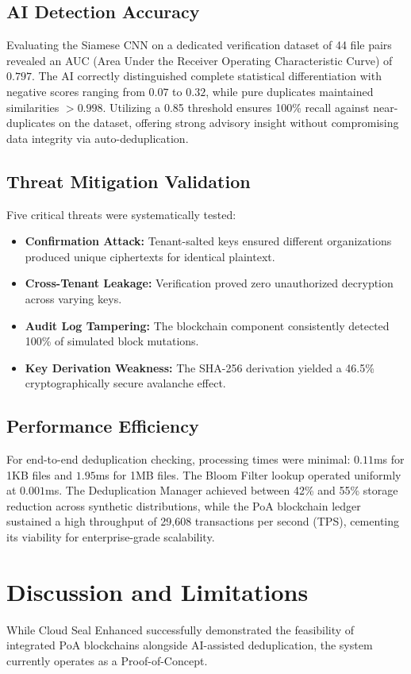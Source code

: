 \documentclass[conference]{IEEEtran}
\begin{document}
\subsection{AI Detection Accuracy}
Evaluating the Siamese CNN on a dedicated verification dataset of 44 file pairs revealed an AUC (Area Under the Receiver Operating Characteristic Curve) of $0.797$. The AI correctly distinguished complete statistical differentiation with negative scores ranging from $0.07$ to $0.32$, while pure duplicates maintained similarities $>0.998$. Utilizing a 0.85 threshold ensures 100\% recall against near-duplicates on the dataset, offering strong advisory insight without compromising data integrity via auto-deduplication. 

\subsection{Threat Mitigation Validation}
Five critical threats were systematically tested:
\begin{itemize}
    \item \textbf{Confirmation Attack:} Tenant-salted keys ensured different organizations produced unique ciphertexts for identical plaintext.
    \item \textbf{Cross-Tenant Leakage:} Verification proved zero unauthorized decryption across varying keys.
    \item \textbf{Audit Log Tampering:} The blockchain component consistently detected 100\% of simulated block mutations.
    \item \textbf{Key Derivation Weakness:} The SHA-256 derivation yielded a 46.5\% cryptographically secure avalanche effect.
\end{itemize}

\subsection{Performance Efficiency}
For end-to-end deduplication checking, processing times were minimal: $0.11$ms for 1KB files and $1.95$ms for 1MB files. The Bloom Filter lookup operated uniformly at $0.001$ms. The Deduplication Manager achieved between 42\% and 55\% storage reduction across synthetic distributions, while the PoA blockchain ledger sustained a high throughput of 29,608 transactions per second (TPS), cementing its viability for enterprise-grade scalability.

\section{Discussion and Limitations}
While Cloud Seal Enhanced successfully demonstrated the feasibility of integrated PoA blockchains alongside AI-assisted deduplication, the system currently operates as a Proof-of-Concept.
\end{document}
